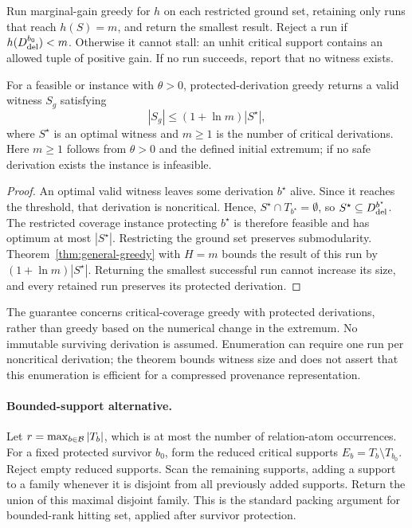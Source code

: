 Run marginal-gain greedy
for $h$ on each restricted ground set, retaining only runs that reach
$h(S)=m$, and return the smallest result. Reject a run if $h(D_{\mathrm{del}}^{b_0})<m$. Otherwise it cannot stall: an
unhit critical support contains an allowed tuple of positive gain.
If no run succeeds, report that no witness exists.

\begin{theorem}
\label{thm:extrema-greedy}
For a feasible  or  instance with $\theta>0$,
protected-derivation greedy returns a valid witness $S_g$ satisfying
\begin{equation}
\label{eq:extrema-greedy-bound}
|S_g|\le(1+\ln m)|S^\star|,
\end{equation}
where $S^\star$ is an optimal witness and $m\ge1$ is the number of
critical derivations. Here $m\ge1$ follows from $\theta>0$ and the defined
initial extremum; if no safe derivation exists the instance is infeasible.
\end{theorem}
\begin{proof}
An optimal valid witness leaves some derivation $b^\star$ alive.
Since it reaches the threshold, that derivation is noncritical.
Hence, $S^\star\cap T_{b^\star}=\emptyset$, so
$S^\star\subseteq D_{\mathrm{del}}^{b^\star}$. The restricted coverage instance
protecting $b^\star$ is therefore feasible and has optimum at most
$|S^\star|$. Restricting the ground set preserves submodularity.
Theorem~\ref{thm:general-greedy} with $H=m$ bounds the result of this
run by $(1+\ln m)|S^\star|$. Returning the smallest successful run
cannot increase its size, and every retained run preserves its
protected derivation.
\end{proof}

The guarantee concerns critical-coverage greedy with protected
derivations, rather than greedy based on the numerical change in the
extremum. No immutable surviving derivation is assumed. Enumeration
can require one run per noncritical derivation; the theorem bounds
witness size and does not assert that this enumeration is efficient
for a compressed provenance representation.

\paragraph{Bounded-support alternative.}
Let $r=\max_{b\in\mathcal{B}}|T_b|$, which is at most the number of relation-atom
occurrences. For a fixed protected survivor $b_0$, form the reduced
critical supports $E_b=T_b\setminus T_{b_0}$. Reject empty reduced
supports. Scan the remaining supports, adding a support to a family
whenever it is disjoint from all previously added supports. Return the
union of this maximal disjoint family. This is the standard packing
argument for bounded-rank hitting set, applied after survivor protection.

